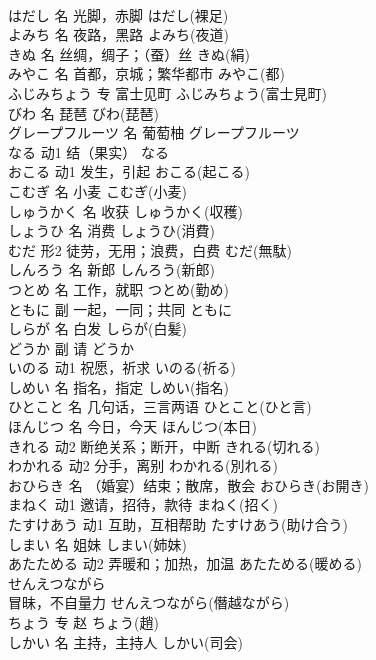 \documentclass[8pt]{extreport}
\begin{document}
\begin{CJK}{UTF8}{min}
\\	はだし	名	光脚，赤脚	はだし(裸足)	
\\	よみち	名	夜路，黑路	よみち(夜道)	
\\	きぬ	名	丝绸，绸子；（蚕）丝	きぬ(絹)	
\\	みやこ	名	首都，京城；繁华都市	みやこ(都)	
\\	ふじみちょう	专	富士见町	ふじみちょう(富士見町)	
\\	びわ	名	琵琶	びわ(琵琶)	
\\	グレープフルーツ	名	葡萄柚	グレープフルーツ	
\\	なる	动1	结（果实）	なる	
\\	おこる	动1	发生，引起	おこる(起こる)	
\\	こむぎ	名	小麦	こむぎ(小麦)	
\\	しゅうかく	名	收获	しゅうかく(収穫)	
\\	しょうひ	名	消费	しょうひ(消費)	
\\	むだ	形2	徒劳，无用；浪费，白费	むだ(無駄)	
\\	しんろう	名	新郎	しんろう(新郎)	
\\	つとめ	名	工作，就职	つとめ(勤め)	
\\	ともに	副	一起，一同；共同	ともに	
\\	しらが	名	白发	しらが(白髪)	
\\	どうか	副	请	どうか	
\\	いのる	动1	祝愿，祈求	いのる(祈る)	
\\	しめい	名	指名，指定	しめい(指名)	
\\	ひとこと	名	几句话，三言两语	ひとこと(ひと言)	
\\	ほんじつ	名	今日，今天	ほんじつ(本日)	
\\	きれる	动2	断绝关系；断开，中断	きれる(切れる)	
\\	わかれる	动2	分手，离别	わかれる(別れる)	
\\	おひらき	名	（婚宴）结束；散席，散会	おひらき(お開き)	
\\	まねく	动1	邀请，招待，款待	まねく(招く)	
\\	たすけあう	动1	互助，互相帮助	たすけあう(助け合う)	
\\	しまい	名	姐妹	しまい(姉妹)	
\\	あたためる	动2	弄暖和；加热，加温	あたためる(暖める)	
\\	せんえつながら	
\\	冒昧，不自量力	せんえつながら(僭越ながら)	
\\	ちょう	专	赵	ちょう(趙)	
\\	しかい	名	主持，主持人	しかい(司会)	

\end{CJK}
\end{document}
